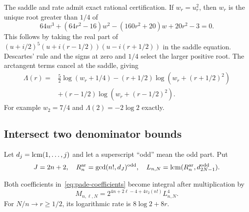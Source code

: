 The saddle and rate admit exact rational certification. If $w_r=u_r^2$,
then $w_r$ is the unique root greater than $1/4$ of
\[
 64w^3+(64r^2-16)w^2-(160r^2+20)w+20r^2-3=0.
\]
This follows by taking the real part of
$(u+i/2)^5(u+i(r-1/2))(u-i(r+1/2))$ in the saddle equation.
Descartes' rule and the signs at zero and $1/4$ select the larger
positive root. The arctangent terms cancel at the saddle, giving
\begin{align*}
 \Lambda(r)={}&\tfrac52\log(w_r+1/4)
 -(r+1/2)\log(w_r+(r+1/2)^2)\\
 &+(r-1/2)\log(w_r+(r-1/2)^2).
\end{align*}
For example $w_2=7/4$ and $\Lambda(2)=-2\log2$ exactly.

\subsection{Intersect two denominator bounds}
Let $d_j=\operatorname{lcm}(1,\ldots,j)$ and let a superscript ``odd'' mean the
odd part. Put
\[
 J=2n+2,\quad R_n^{\rm ar}=\gcd(n!,d_J)^{\rm odd},\quad
 L_{n,N}=\operatorname{lcm}(R_n^{\rm ar},d_{2N-1}^{\rm odd}).
\]
\begin{proposition}\label{prop:pade-clearing}
Both coefficients in~\eqref{eq:pade-coefficients} become integral after
multiplication by
\[
 M_{n,\ell,N}=2^{4n+2\ell-4+4v_2(n!)}L_{n,N}^4.
\]
For $N/n\to r\ge1/2$, its logarithmic rate is $8\log2+8r$.
\end{proposition}

